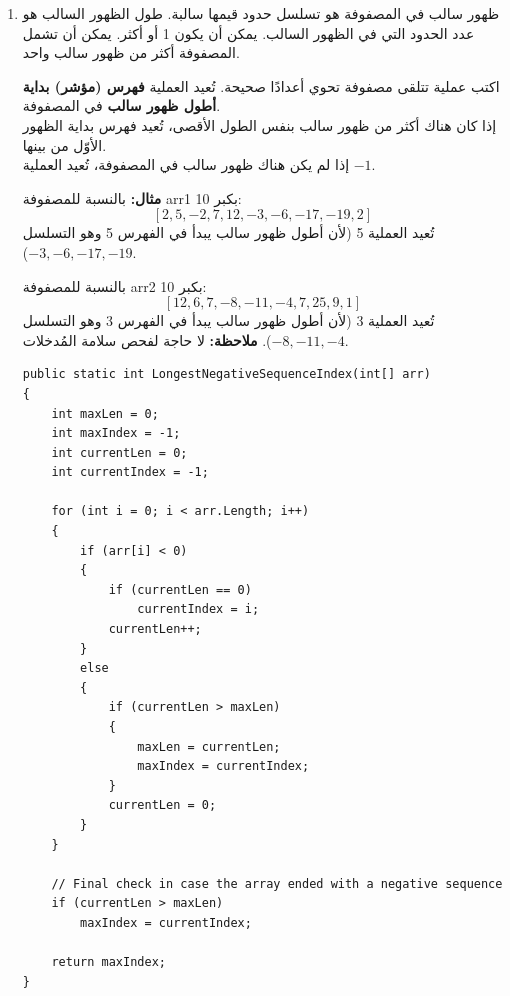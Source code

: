 \documentclass[14pt]{extarticle}
\begin{document}
\begin{enumerate}[itemsep=3em]
\begin{boxSolution}
\begin{english}
\begin{verbatim}
    return true;
}
\end{verbatim}
\end{english}
\end{boxSolution}
\fi


\clearpage
\item
ظهور سالب في المصفوفة هو تسلسل حدود قيمها سالبة. طول الظهور السالب هو عدد الحدود التي في الظهور السالب. يمكن أن يكون 1 أو أكثر. يمكن أن تشمل المصفوفة أكثر من ظهور سالب واحد.

اكتب عملية تتلقى مصفوفة تحوي أعدادًا صحيحة.
تُعيد العملية \textbf{فهرس (مؤشر) بداية أطول ظهور سالب} في المصفوفة. \\
إذا كان هناك أكثر من ظهور سالب بنفس الطول الأقصى، تُعيد فهرس بداية الظهور الأوّل من بينها. \\
إذا لم يكن هناك ظهور سالب في المصفوفة، تُعيد العملية $-1$.

\textbf{مثال:} بالنسبة للمصفوفة \textenglish{arr1} بكبر 10:
$$ [2, 5, -2, 7, 12, -3, -6, -17, -19, 2] $$
تُعيد العملية 5 (لأن أطول ظهور سالب يبدأ في الفهرس 5 وهو التسلسل $-3, -6, -17, -19$).

بالنسبة للمصفوفة \textenglish{arr2} بكبر 10:
$$ [12, 6, 7, -8, -11, -4, 7, 25, 9, 1] $$
تُعيد العملية 3 (لأن أطول ظهور سالب يبدأ في الفهرس 3 وهو التسلسل $-8, -11, -4$).
\textbf{ملاحظة:} لا حاجة لفحص سلامة المُدخلات.

\ifwithsols
\begin{boxSolution}
\begin{english}
\begin{verbatim}
public static int LongestNegativeSequenceIndex(int[] arr)
{
    int maxLen = 0;
    int maxIndex = -1;
    int currentLen = 0;
    int currentIndex = -1;

    for (int i = 0; i < arr.Length; i++)
    {
        if (arr[i] < 0)
        {
            if (currentLen == 0)
                currentIndex = i;
            currentLen++;
        }
        else
        {
            if (currentLen > maxLen)
            {
                maxLen = currentLen;
                maxIndex = currentIndex;
            }
            currentLen = 0;
        }
    }

    // Final check in case the array ended with a negative sequence
    if (currentLen > maxLen)
        maxIndex = currentIndex;

    return maxIndex;
}
\end{verbatim}
\end{english}
\end{boxSolution}
\fi
\clearpage


\end{enumerate}
\end{document}
